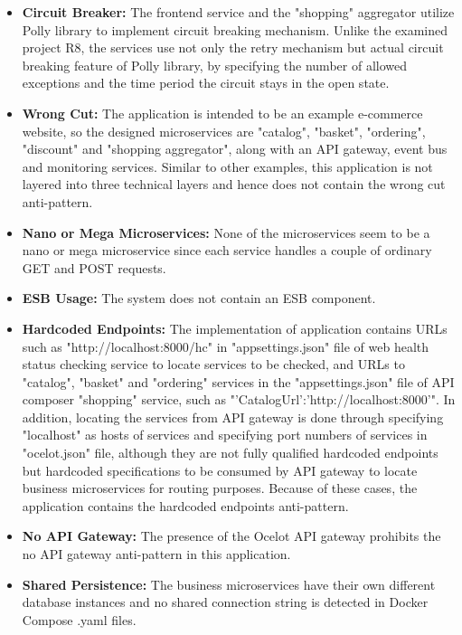 \documentclass{Configuration_Files/PoliMi3i_thesis}
\begin{document}
\begin{itemize}
    \item \textbf{Circuit Breaker:} The frontend service and the "shopping" aggregator utilize Polly library to implement circuit breaking mechanism.
    Unlike the examined project R8, the services use not only the retry mechanism but actual circuit breaking feature of Polly library, by specifying the number of allowed exceptions and the time period the circuit stays in the open state.
    
    \item \textbf{Wrong Cut:} The application is intended to be an example e-commerce website, so the designed microservices are "catalog", "basket", "ordering", "discount" and "shopping aggregator", along with an API gateway, event bus and monitoring services.
    Similar to other examples, this application is not layered into three technical layers and hence does not contain the wrong cut anti-pattern.
    
    \item \textbf{Nano or Mega Microservices:} None of the microservices seem to be a nano or mega microservice since each service handles a couple of ordinary GET and POST requests.
    
    \item \textbf{ESB Usage:} The system does not contain an ESB component.
    
    \item \textbf{Hardcoded Endpoints:} The implementation of application contains URLs such as "http://localhost:8000/hc" in "appsettings.json" file of web health status checking service to locate services to be checked, and URLs to "catalog", "basket" and "ordering" services in the "appsettings.json" file of API composer "shopping" service, such as "'CatalogUrl':'http://localhost:8000'".
    In addition, locating the services from API gateway is done through specifying "localhost" as hosts of services and specifying port numbers of services in "ocelot.json" file, although they are not fully qualified hardcoded endpoints but hardcoded specifications to be consumed by API gateway to locate business microservices for routing purposes.
    Because of these cases, the application contains the hardcoded endpoints anti-pattern.
    
    \item \textbf{No API Gateway:} The presence of the Ocelot API gateway prohibits the no API gateway anti-pattern in this application.
    
    \item \textbf{Shared Persistence:} The business microservices have their own different database instances and no shared connection string is detected in Docker Compose .yaml files.
    

\end{itemize}
\end{document}
